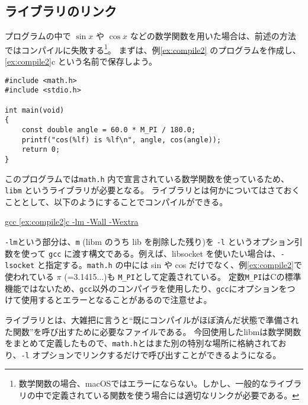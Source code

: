 \subsection{ライブラリのリンク}
プログラムの中で \(\sin x\) や \(\cos x\) などの数学関数を用いた場合は、前述の方法ではコンパイルに失敗する\footnote{数学関数の場合、macOSではエラーにならない。しかし、一般的なライブラリの中で定義されている関数を使う場合には適切なリンクが必要である。}。
まずは、例\ref{ex:compile2} のプログラムを作成し、\ref{ex:compile2}c という名前で保存しよう。
\begin{reidai}\label{ex:compile2}
    \begin{verbatim}
#include <math.h>
#include <stdio.h>

int main(void)
{
    const double angle = 60.0 * M_PI / 180.0;
    printf("cos(%lf) is %lf\n", angle, cos(angle));
    return 0;
}
\end{verbatim}
\end{reidai} \noindent
このプログラムでは\texttt{math.h} 内で宣言されている数学関数を使っているため、\texttt{libm} というライブラリが必要となる。
ライブラリとは何かについてはさておくこととして、以下のようにすることでコンパイルができる。
\begin{commandline2}
    \prompt \underline{gcc \ref{ex:compile2}c -lm -Wall -Wextra}
\end{commandline2} \noindent
\texttt{-lm}という部分は、\texttt{m} (libm のうち lib を削除した残り)を \texttt{-l} というオプション引数を使って \texttt{gcc} に渡す構文である。例えば、libsocket を使いたい場合は、\texttt{-lsocket} と指定する。\texttt{math.h} の中には sin や cos だけでなく、例\ref{ex:compile2}で使われている \(\pi\) (=3.1415...)も \texttt{M\_PI}として定義されている。
定数\texttt{M\_PI}はCの標準機能ではないため、\texttt{gcc}以外のコンパイラを使用したり、\texttt{gcc}にオプションをつけて使用するとエラーとなることがあるので注意せよ。

ライブラリとは、大雑把に言うと``既にコンパイルがほぼ済んだ状態で準備された関数''を呼び出すために必要なファイルである。
今回使用したlibmは数学関数をまとめて定義したもので、\texttt{math.h}とはまた別の特別な場所に格納されており、\texttt{-l} オプションでリンクするだけで呼び出すことができるようになる。

